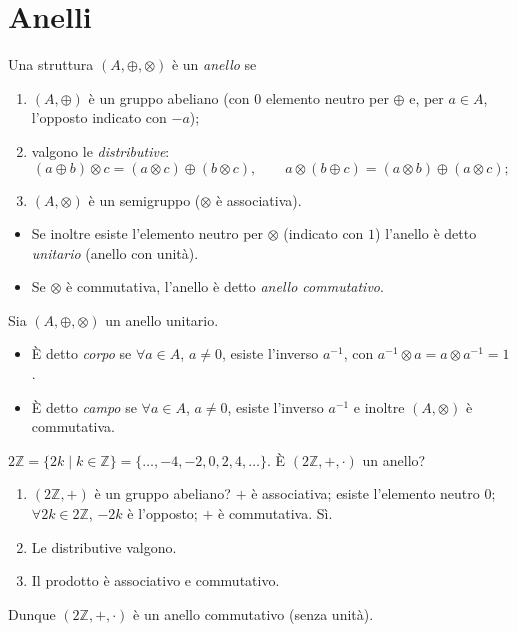 \documentclass[11pt,a4paper]{article}
\begin{document}
\section{Anelli}

\begin{definizione}[Anello]
Una struttura $(A, \oplus, \otimes)$ è un \emph{anello} se
\begin{enumerate}
  \item $(A, \oplus)$ è un gruppo abeliano (con $0$ elemento neutro per $\oplus$ e, per $a \in A$, l'opposto indicato con $-a$);
  \item valgono le \emph{distributive}:
  \[
    (a \oplus b) \otimes c = (a \otimes c) \oplus (b \otimes c), \qquad
    a \otimes (b \oplus c) = (a \otimes b) \oplus (a \otimes c);
  \]
  \item $(A, \otimes)$ è un semigruppo ($\otimes$ è associativa).
\end{enumerate}
\end{definizione}

\begin{itemize}
  \item Se inoltre esiste l'elemento neutro per $\otimes$ (indicato con $1$) l'anello è detto \emph{unitario} (anello con unità).
  \item Se $\otimes$ è commutativa, l'anello è detto \emph{anello commutativo}.
\end{itemize}

\begin{definizione}
Sia $(A, \oplus, \otimes)$ un anello unitario.
\begin{itemize}
  \item È detto \emph{corpo} se $\forall a \in A$, $a \neq 0$, esiste l'inverso $a^{-1}$, con $a^{-1} \otimes a = a \otimes a^{-1} = 1$.
  \item È detto \emph{campo} se $\forall a \in A$, $a \neq 0$, esiste l'inverso $a^{-1}$ e inoltre $(A, \otimes)$ è commutativa.
\end{itemize}
\end{definizione}

\begin{esempio}[$2\mathbb{Z}$]
$2\mathbb{Z} = \{2k \mid k \in \mathbb{Z}\} = \{\dots, -4, -2, 0, 2, 4, \dots\}$. È $(2\mathbb{Z}, +, \cdot)$ un anello?
\begin{enumerate}
  \item $(2\mathbb{Z}, +)$ è un gruppo abeliano? $+$ è associativa; esiste l'elemento neutro $0$; $\forall 2k \in 2\mathbb{Z}$, $-2k$ è l'opposto; $+$ è commutativa. Sì.
  \item Le distributive valgono.
  \item Il prodotto è associativo e commutativo.
\end{enumerate}
Dunque $(2\mathbb{Z}, +, \cdot)$ è un anello commutativo (senza unità).
\end{esempio}
\end{document}
